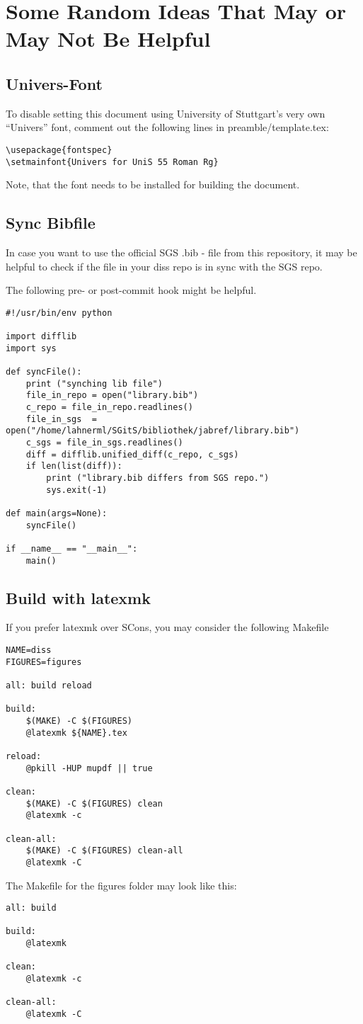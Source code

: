 \chapter{Some Random Ideas That May or May Not Be Helpful}
\section{Univers-Font}
To disable setting this document using University of Stuttgart's very own
``Univers'' font, comment out the following lines in preamble/template.tex:
\begin{verbatim}
\usepackage{fontspec}
\setmainfont{Univers for UniS 55 Roman Rg}
\end{verbatim}
Note, that the font needs to be installed for building the document.

\section{Sync Bibfile}
In case you want to use the official SGS .bib - file from this repository, it
may be helpful to check if the file in your diss repo is in sync with the SGS
repo.

The following pre- or post-commit hook might be helpful.
\begin{verbatim}
#!/usr/bin/env python

import difflib
import sys

def syncFile():
    print ("synching lib file")
    file_in_repo = open("library.bib")
    c_repo = file_in_repo.readlines()
    file_in_sgs  = open("/home/lahnerml/SGitS/bibliothek/jabref/library.bib")
    c_sgs = file_in_sgs.readlines()
    diff = difflib.unified_diff(c_repo, c_sgs)
    if len(list(diff)):
        print ("library.bib differs from SGS repo.")
        sys.exit(-1)

def main(args=None):
    syncFile()

if __name__ == "__main__":
    main()
\end{verbatim}

\section{Build with latexmk}
If you prefer latexmk over SCons, you may consider the following Makefile
\begin{verbatim}
NAME=diss
FIGURES=figures

all: build reload

build:
	$(MAKE) -C $(FIGURES)
	@latexmk ${NAME}.tex

reload:
	@pkill -HUP mupdf || true

clean:
	$(MAKE) -C $(FIGURES) clean
	@latexmk -c

clean-all:
	$(MAKE) -C $(FIGURES) clean-all
	@latexmk -C
\end{verbatim}
The Makefile for the figures folder may look like this:
\begin{verbatim}
all: build

build:
	@latexmk

clean:
	@latexmk -c

clean-all:
	@latexmk -C
\end{verbatim}

